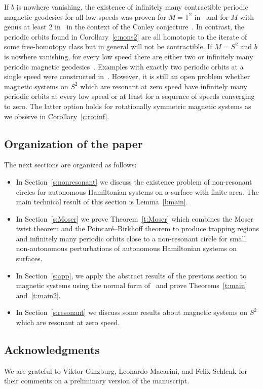 \documentclass[AHL,Unicode,longabstracts,published]{cedram}
\newcommand{\T}{\mathbb{T}}
\begin{document}
If $b$ is nowhere vanishing, the existence of infinitely many contractible periodic magnetic geodesics for all low speeds was proven for $M=\T^2$ in~\cite{Ginzburg:2009} and for $M$ with genus at least $2$ in~\cite{Ginzburg:2014ws} in the context of the Conley conjecture~\cite{Ginzburg:2015}. In contrast, the periodic orbits found in Corollary~\ref{c:nons2} are all homotopic to the iterate of some free-homotopy class but in general will not be contractible. If $M=S^2$ and $b$ is nowhere vanishing, for every low speed there are either two or infinitely many periodic magnetic geodesics~\cite{Benedetti:2014}. Examples with exactly two periodic orbits at a single speed were constructed in~\cite{Benedetti:2016}. However, it is still an open problem whether magnetic systems on $S^2$ which are resonant at zero speed have infinitely many periodic orbits at every low speed or at least for a sequence of speeds converging to zero. The latter option holds for rotationally symmetric magnetic systems as we observe in Corollary~\ref{c:rotinf}.

\subsection*{Organization of the paper}

The next sections are organized as follows:
\begin{itemize}
\item In Section~\ref{s:nonresonant} we discuss the existence problem of non-resonant circles for autonomous Hamiltonian systems on a surface with finite area. The main technical result of this section is Lemma~\ref{l:main}.
\item In Section~\ref{s:Moser} we prove Theorem~\ref{t:Moser} which combines the Moser twist theorem and the Poincaré--Birkhoff theorem to produce trapping regions and infinitely many periodic orbits close to a non-resonant circle for small non-autonomous perturbations of autonomous Hamiltonian systems on surfaces.
\item In Section~\ref{s:app}, we apply the abstract results of the previous section to magnetic systems using the normal form of~\cite{AB21,Castilho:2001} and prove Theorems~\ref{t:main} and~\ref{t:main2}.
\item In Section~\ref{s:resonant} we discuss some results about magnetic systems on $S^2$ which are resonant at zero speed.
\end{itemize}

\subsection*{Acknowledgments}
We are grateful to Viktor Ginzburg, Leonardo Macarini, and Felix Schlenk for their comments on a preliminary version of the manuscript.
\end{document}
